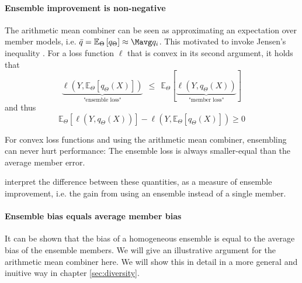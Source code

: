 \documentclass[
	twoside=false, %
]{kaobook}
\begin{document}
\paragraph{Ensemble improvement is non-negative} The arithmetic mean combiner can be seen as approximating an expectation over member models, i.e. $\bar{q} = \mathbb{E}_{\Theta} \left[q_{\Theta}\right] \approx \Mavg q_i$.
This motivated \cite{abe_PathologiesPredictiveDiversity_2023} to invoke Jensen's inequality
. For a loss function $\ell$ that is convex in its second argument, it holds that
$$
\underbrace{
\ell(Y, \mathbb{E}_{\Theta}\left[ q_{\Theta}(X)\right] ) 
}_{\text{"ensemble loss"}}
~ ~ \leq ~ ~ 
\mathbb{E}_{\Theta}\left[ 
\underbrace{
\ell(Y,q_{\Theta}(X))  
}_{\text{"member loss"}}
\right]
$$
and thus
$$
\mathbb{E}_{{\Theta}}\left[ \ell (Y, q_{\Theta}(X)) \right]  -
\ell(Y, \mathbb{E}_{\Theta}\left[ q_{\Theta}(X) \right]) \geq 0
$$
\begin{corollary}
  For convex loss functions and using the arithmetic mean combiner, ensembling can never hurt performance: The ensemble loss is always smaller-equal than the average member error.
\end{corollary}
\citeauthor{abe_PathologiesPredictiveDiversity_2023} \cite{abe_PathologiesPredictiveDiversity_2023} interpret the difference between these quantities, as a measure of ensemble improvement, i.e. the gain from using an ensemble instead of a single member.

\paragraph{Ensemble bias equals average member bias}
It can be shown that the bias of a homogeneous ensemble is equal to the average bias of the ensemble members. We will give an illustrative argument for the arithmetic mean combiner here.
We will show this in detail in a more general and inuitive way in chapter \ref{sec:diversity}.
\end{document}
